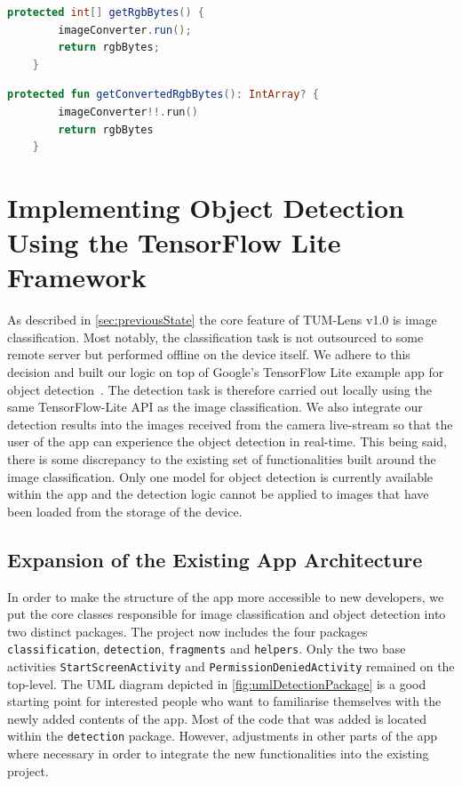 \documentclass[
			   fontsize=11pt,
               paper=a4,
               bibliography=totoc,
               idxtotoc,
               headsepline,
               footsepline,
               footinclude=false,
               BCOR=12mm,
               DIV=13,
               openany,   %
               ]
               {scrbook}
\newcommand{\code}[1]{\lstinline[basicstyle = \ttfamily\small]{#1}} %
\begin{document}
\begin{lstlisting}[style=standard, language=Java, label=code:bugSourceJava, caption={Java code that lead to the introduction of a bug after using Android Studio's built-in Java to Kotlin conversion command. The bug was created when this code block was substituted with a default getter in Kotlin omitting parts of its logic.}]
	protected int[] getRgbBytes() {
		imageConverter.run();
		return rgbBytes;
	}
\end{lstlisting}

\begin{lstlisting}[style=standard, language=Kotlin, label=code:bugSolutionKotlin, caption={Complementing the default Kotlin getter with this method solved the problem.}]
	protected fun getConvertedRgbBytes(): IntArray? {
		imageConverter!!.run()
		return rgbBytes
	}
\end{lstlisting}

\chapter{Implementing Object Detection Using the TensorFlow Lite Framework}

As described in \autoref{sec:previousState} the core feature of TUM-Lens v1.0 is image classification. Most notably, the classification task is not outsourced to some remote server but performed offline on the device itself. We adhere to this decision and built our logic on top of Google's TensorFlow Lite example app for object detection~\cite{tfSampleAppGuide, tfSampleAppRepo}. The detection task is therefore carried out locally using the same TensorFlow-Lite API as the image classification. We also integrate our detection results into the images received from the camera live-stream so that the user of the app can experience the object detection in real-time. This being said, there is some discrepancy to the existing set of functionalities built around the image classification. Only one model for object detection is currently available within the app and the detection logic cannot be applied to images that have been loaded from the storage of the device.

\section{Expansion of the Existing App Architecture}

In order to make the structure of the app more accessible to new developers, we put the core classes responsible for image classification and object detection into two distinct packages. The project now includes the four packages \code{classification}, \code{detection}, \code{fragments} and \code{helpers}. Only the two base activities \code{StartScreenActivity} and \code{PermissionDeniedActivity} remained on the top-level. The UML diagram depicted in \autoref{fig:umlDetectionPackage} is a good starting point for interested people who want to familiarise themselves with the newly added contents of the app. Most of the code that was added is located within the \code{detection} package. However, adjustments in other parts of the app where necessary in order to integrate the new functionalities into the existing project.
\end{document}
